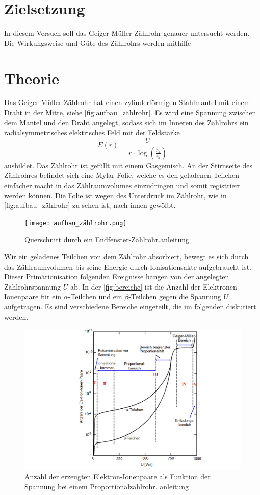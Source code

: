 \section{Zielsetzung}
\label{sec:Zielsetzung}
In diesem Versuch soll das Geiger-Müller-Zählrohr genauer untersucht werden. Die Wirkungsweise und Güte des Zählrohrs werden mithilfe 
\section{Theorie}
\label{sec:Theorie}
Das Geiger-Müller-Zählrohr hat einen zylinderförmigen Stahlmantel mit einem Draht in der Mitte, siehe \autoref{fig:aufbau_zählrohr}.
Es wird eine Spannung zwischen dem Mantel und den Draht angelegt, sodass sich im Inneren des Zählrohrs ein radialsymmetrisches elektrisches Feld mit der Feldstärke
\begin{equation*}
    E(r) = \frac{U}{r \cdot \log(\frac{r_{\text{k}}}{r_{\text{a}}})}
\end{equation*}
ausbildet.
Das Zählrohr ist gefüllt mit einem Gasgemisch.
An der Stirnseite des Zählrohres befindet sich eine Mylar-Folie, welche es den geladenen Teilchen einfacher macht in das Zählraumvolumes einzudringen und somit registriert werden können.
Die Folie ist wegen des Unterdruck im Zählrohr, wie in \autoref{fig:aufbau_zählrohr} zu sehen ist, nach innen gewölbt.
\begin{figure}
    \centering
    \texttt{[image: aufbau\_zählrohr.png]}
    \caption{Querschnitt durch ein Endfenster-Zählrohr.\cite{1}{anleitung}}
    \label{fig:aufbau_zählrohr}
\end{figure}
Wir ein geladenes Teilchen von dem Zählrohr absorbiert, bewegt es sich durch das Zählraumvolumen bis seine Energie durch Ionisationsakte aufgebraucht ist.
Dieser Primärionisation folgenden Ereignisse hängen von der angelegten Zählrohrspannung $U$ ab.
In der \autoref{fig:bereiche} ist die Anzahl der Elektronen-Ionenpaare für ein $\alpha$-Teilchen und ein $\beta$-Teilchen gegen die Spannung $U$ aufgetragen.
Es sind verschiedene Bereiche eingeteilt, die im folgenden diskutiert werden.
\begin{figure}
    \centering
    \includegraphics[width=\textwidth]{bereiche.png}
    \caption{Anzahl der erzeugten Elektron-Ionenpaare als Funktion der Spannung bei einem Proportionalzählrohr. \cite{2}{anleitung}}
    \label{fig:bereiche}
\end{figure}

